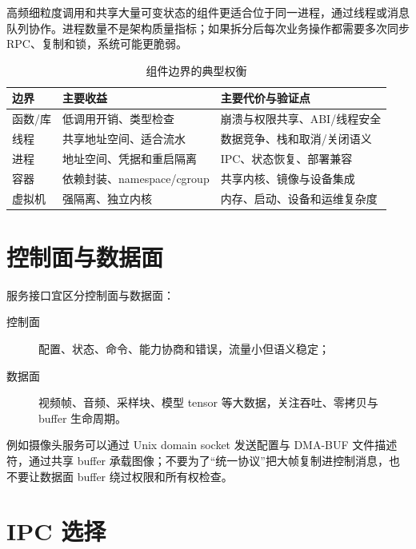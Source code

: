 高频细粒度调用和共享大量可变状态的组件更适合位于同一进程，通过线程或消息队列协作。进程数量不是架构质量指标；如果拆分后每次业务操作都需要多次同步 RPC、复制和锁，系统可能更脆弱。

\begin{table}[H]
  \centering
  \caption{组件边界的典型权衡}
  \begin{tabular}{p{28mm}p{51mm}p{57mm}}
    \hline
    边界 & 主要收益 & 主要代价与验证点 \\
    \hline
    函数/库 & 低调用开销、类型检查 & 崩溃与权限共享、ABI/线程安全 \\
    线程 & 共享地址空间、适合流水 & 数据竞争、栈和取消/关闭语义 \\
    进程 & 地址空间、凭据和重启隔离 & IPC、状态恢复、部署兼容 \\
    容器 & 依赖封装、namespace/cgroup & 共享内核、镜像与设备集成 \\
    虚拟机 & 强隔离、独立内核 & 内存、启动、设备和运维复杂度 \\
    \hline
  \end{tabular}
\end{table}

\section{控制面与数据面}

服务接口宜区分控制面与数据面：

\begin{description}
  \item[控制面] 配置、状态、命令、能力协商和错误，流量小但语义稳定；
  \item[数据面] 视频帧、音频、采样块、模型 tensor 等大数据，关注吞吐、零拷贝与 buffer 生命周期。
\end{description}

例如摄像头服务可以通过 Unix domain socket 发送配置与 DMA-BUF 文件描述符，通过共享 buffer 承载图像；不要为了“统一协议”把大帧复制进控制消息，也不要让数据面 buffer 绕过权限和所有权检查。

\section{IPC 选择}

